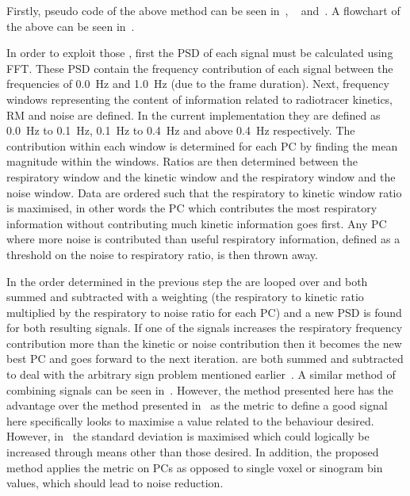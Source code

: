                     Firstly, pseudo code of the above method can be seen in~, ~ and~. A flowchart of the above can be seen in~.
                    
                    In order to exploit those , first the \gls{PSD} of each signal must be calculated using \gls{FFT}. These \gls{PSD} contain the frequency contribution of each signal between the frequencies of \SI{0.0}{\hertz} and \SI{1.0}{\hertz} (due to the frame duration). Next, frequency windows representing the content of information related to radiotracer kinetics, \gls{RM} and noise are defined. In the current implementation they are defined as \SI{0.0}{\hertz} to \SI{0.1}{\hertz}, \SI{0.1}{\hertz} to \SI{0.4}{\hertz} and above \SI{0.4}{\hertz} respectively. The contribution within each window is determined for each \gls{PC} by finding the mean magnitude within the windows. Ratios are then determined between the respiratory window and the kinetic window and the respiratory window and the noise window. Data are ordered such that the respiratory to kinetic window ratio is maximised, in other words the \gls{PC} which contributes the most respiratory information without contributing much kinetic information goes first. Any \gls{PC} where more noise is contributed than useful respiratory information, defined as a threshold on the noise to respiratory ratio, is then thrown away.
                    
                    In the order determined in the previous step the  are looped over and both summed and subtracted with a weighting (the respiratory to kinetic ratio multiplied by the respiratory to noise ratio for each \gls{PC}) and a new \gls{PSD} is found for both resulting signals. If one of the signals increases the respiratory frequency contribution more than the kinetic or noise contribution then it becomes the new best \gls{PC} and goes forward to the next iteration.  are both summed and subtracted to deal with the arbitrary sign problem mentioned earlier~. A similar method of combining signals can be seen in~. However, the method presented here has the advantage over the method presented in~ as the metric to define a good signal here specifically looks to maximise a value related to the behaviour desired. However, in~ the standard deviation is maximised which could logically be increased through means other than those desired. In addition, the proposed method applies the metric on \glspl{PC} as opposed to single voxel or sinogram bin values, which should lead to noise reduction.
                
